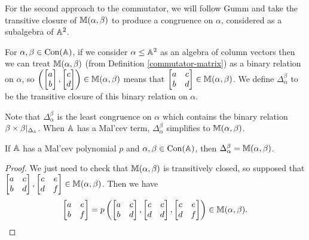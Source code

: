 \documentclass[letterpaper,11pt]{article}
\DeclareMathOperator{\Con}{Con}
\begin{document}
For the second approach to the commutator, we will follow Gumm \cite{gumm-geometric} and take the transitive closure of $\mathbb{M}(\alpha,\beta)$ to produce a congruence on $\alpha$, considered as a subalgebra of $\mathbb{A}^2$.

\begin{defn} For $\alpha,\beta \in \Con(\bA)$, if we consider $\alpha \le \mathbb{A}^2$ as an algebra of column vectors then we can treat $\mathbb{M}(\alpha,\beta)$ (from Definition \ref{commutator-matrix}) as a binary relation on $\alpha$, so $\left(\begin{bmatrix} a\\ b\end{bmatrix},\begin{bmatrix} c \\ d\end{bmatrix}\right) \in \mathbb{M}(\alpha,\beta)$ means that $\begin{bmatrix} a & c\\ b & d\end{bmatrix} \in \mathbb{M}(\alpha,\beta)$. We define $\Delta_\alpha^\beta$ to be the transitive closure of this binary relation on $\alpha$.
\end{defn}

Note that $\Delta_\alpha^\beta$ is the least congruence on $\alpha$ which contains the binary relation $\beta\times\beta|_{\Delta_{\mathbb{A}}}$. When $\mathbb{A}$ has a Mal'cev term, $\Delta_\alpha^\beta$ simplifies to $\mathbb{M}(\alpha,\beta)$.

\begin{prop} If $\mathbb{A}$ has a Mal'cev polynomial $p$ and $\alpha,\beta \in \Con(\bA)$, then $\Delta_\alpha^\beta = \mathbb{M}(\alpha,\beta)$.
\end{prop}
\begin{proof} We just need to check that $\mathbb{M}(\alpha,\beta)$ is transitively closed, so supposed that $\begin{bmatrix} a & c\\ b & d\end{bmatrix}, \begin{bmatrix} c & e\\ d & f\end{bmatrix} \in \mathbb{M}(\alpha,\beta)$. Then we have
\[
\begin{bmatrix} a & e\\ b & f\end{bmatrix} = p\left(\begin{bmatrix} a & c\\ b & d\end{bmatrix}, \begin{bmatrix} c & c\\ d & d\end{bmatrix}, \begin{bmatrix} c & e\\ d & f\end{bmatrix}\right) \in \mathbb{M}(\alpha,\beta).\qedhere
\]
\end{proof}
\end{document}
